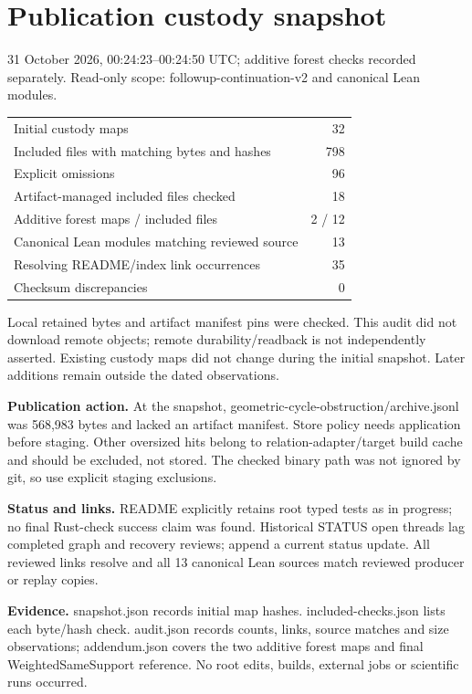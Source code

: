 \documentclass[11pt]{article}
\begin{document}
\section*{Publication custody snapshot}
31 October 2026, 00:24:23--00:24:50 UTC; additive forest checks recorded separately. Read-only scope: followup-continuation-v2 and canonical Lean modules.

\begin{center}\begin{tabular}{lr}
Initial custody maps &32\\
Included files with matching bytes and hashes &798\\
Explicit omissions &96\\
Artifact-managed included files checked &18\\
Additive forest maps / included files &2 / 12\\
Canonical Lean modules matching reviewed source &13\\
Resolving README/index link occurrences &35\\
Checksum discrepancies &0
\end{tabular}\end{center}

Local retained bytes and artifact manifest pins were checked. This audit did not download remote objects; remote durability/readback is not independently asserted. Existing custody maps did not change during the initial snapshot. Later additions remain outside the dated observations.

\textbf{Publication action.} At the snapshot, geometric-cycle-obstruction/archive.jsonl was 568,983 bytes and lacked an artifact manifest. Store policy needs application before staging. Other oversized hits belong to relation-adapter/target build cache and should be excluded, not stored. The checked binary path was not ignored by git, so use explicit staging exclusions.

\textbf{Status and links.} README explicitly retains root typed tests as in progress; no final Rust-check success claim was found. Historical STATUS open threads lag completed graph and recovery reviews; append a current status update. All reviewed links resolve and all 13 canonical Lean sources match reviewed producer or replay copies.

\textbf{Evidence.} snapshot.json records initial map hashes. included-checks.json lists each byte/hash check. audit.json records counts, links, source matches and size observations; addendum.json covers the two additive forest maps and final WeightedSameSupport reference. No root edits, builds, external jobs or scientific runs occurred.
\end{document}
